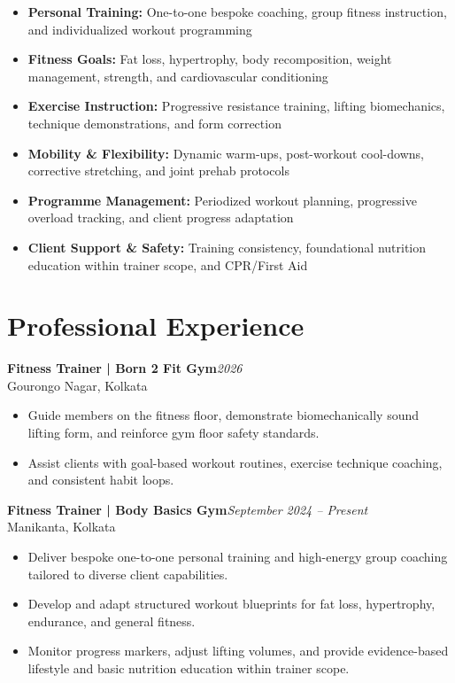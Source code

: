 \documentclass[10pt,a4paper]{article}
\newcommand{\job}[3]{%
  \textbf{#1}\hfill{\small\textit{#2}}\\[-1pt]
  {\small\color{softgray}#3}\par\vspace{-2pt}
}
\begin{document}
\begin{itemize}
    \item \textbf{Personal Training:} One-to-one bespoke coaching, group fitness instruction, and individualized workout programming

    \item \textbf{Fitness Goals:} Fat loss, hypertrophy, body recomposition, weight management, strength, and cardiovascular conditioning

    \item \textbf{Exercise Instruction:} Progressive resistance training, lifting biomechanics, technique demonstrations, and form correction

    \item \textbf{Mobility \& Flexibility:} Dynamic warm-ups, post-workout cool-downs, corrective stretching, and joint prehab protocols

    \item \textbf{Programme Management:} Periodized workout planning, progressive overload tracking, and client progress adaptation

    \item \textbf{Client Support \& Safety:} Training consistency, foundational nutrition education within trainer scope, and CPR/First Aid
\end{itemize}

\section{Professional Experience}

\job{Fitness Trainer | Born 2 Fit Gym}{2026}{Gourongo Nagar, Kolkata}

\begin{itemize}
    \item Guide members on the fitness floor, demonstrate biomechanically sound lifting form, and reinforce gym floor safety standards.
    \item Assist clients with goal-based workout routines, exercise technique coaching, and consistent habit loops.
\end{itemize}

\job{Fitness Trainer | Body Basics Gym}{September 2024 -- Present}{Manikanta, Kolkata}

\begin{itemize}
    \item Deliver bespoke one-to-one personal training and high-energy group coaching tailored to diverse client capabilities.
    \item Develop and adapt structured workout blueprints for fat loss, hypertrophy, endurance, and general fitness.
    \item Monitor progress markers, adjust lifting volumes, and provide evidence-based lifestyle and basic nutrition education within trainer scope.
\end{itemize}
\end{document}
